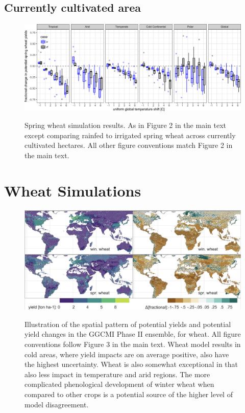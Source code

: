 \documentclass[10pt]{article}
\begin{document}
\subsection{Currently cultivated area}
\begin{figure}[h!]
\includegraphics[width=\textwidth]{s_spring_wheat_sim_CG_area_weight.png}\\
\caption{Spring wheat simulation results. As in Figure 2 in the main text except comparing rainfed to irrigated spring wheat across currently cultivated hectares. All other figure conventions match Figure 2 in the main text.}
\label{fig:maizeCG}
\end{figure}


\clearpage 
\section{Wheat Simulations}
\begin{figure}[h!]
\includegraphics[width=\textwidth]{s_wheat_baseline.png}\\
\caption{Illustration of the spatial pattern of potential yields and potential yield changes in the GGCMI Phase II ensemble, for wheat. All figure conventions follow Figure 3 in the main text. Wheat model results in cold areas, where yield impacts are on average positive, also have the highest uncertainty. Wheat is also somewhat exceptional in that  also less impact in temperature and arid regions. The more complicated phenological development of winter wheat when compared to other crops is a potential source of the higher level of model disagreement.}
\label{fig:wheatbaseline}
\end{figure}
\end{document}

